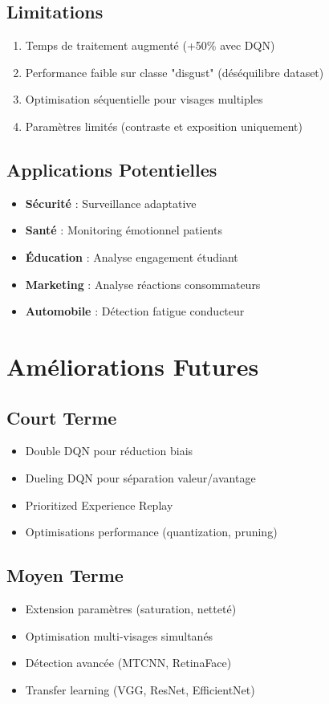 \documentclass[12pt,a4paper]{article}
\begin{document}
\subsection{Limitations}
\begin{enumerate}
    \item Temps de traitement augmenté (+50\% avec DQN)
    \item Performance faible sur classe "disgust" (déséquilibre dataset)
    \item Optimisation séquentielle pour visages multiples
    \item Paramètres limités (contraste et exposition uniquement)
\end{enumerate}

\subsection{Applications Potentielles}
\begin{itemize}
    \item \textbf{Sécurité} : Surveillance adaptative
    \item \textbf{Santé} : Monitoring émotionnel patients
    \item \textbf{Éducation} : Analyse engagement étudiant
    \item \textbf{Marketing} : Analyse réactions consommateurs
    \item \textbf{Automobile} : Détection fatigue conducteur
\end{itemize}

\newpage

\section{Améliorations Futures}

\subsection{Court Terme}
\begin{itemize}
    \item Double DQN pour réduction biais
    \item Dueling DQN pour séparation valeur/avantage
    \item Prioritized Experience Replay
    \item Optimisations performance (quantization, pruning)
\end{itemize}

\subsection{Moyen Terme}
\begin{itemize}
    \item Extension paramètres (saturation, netteté)
    \item Optimisation multi-visages simultanés
    \item Détection avancée (MTCNN, RetinaFace)
    \item Transfer learning (VGG, ResNet, EfficientNet)
\end{itemize}
\end{document}
